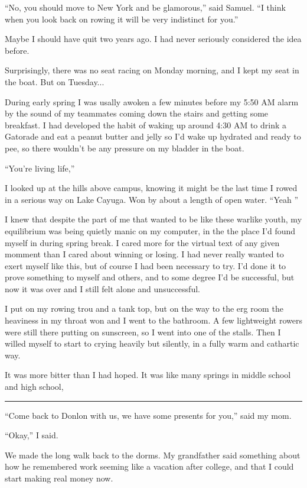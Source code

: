 ``No, you should move to New York and be glamorous,'' said Samuel.  ``I think
when you look back on rowing it will be very indistinct for you.'' 

Maybe I should have quit two years ago.  I had never seriously considered the
idea before.

Surprisingly, there was no seat racing on Monday morning, and I kept my seat in
the boat.  But on Tuesday...

During early spring I was usally awoken a few minutes before my 5:50 AM alarm by
the sound of my teammates coming down the stairs and getting some breakfast.  I
had developed the habit of waking up around 4:30 AM to drink a Gatorade and eat
a peanut butter and jelly so I'd wake up hydrated and ready to pee, so there
wouldn't be any pressure on my bladder in the boat. 

``You're living life,''

I looked up at the hills above campus, knowing it might be the last time I rowed
in a serious way on Lake Cayuga.  Won by about a length of open water.  ``Yeah
'' 

I knew that despite the part of me that wanted to be like these warlike youth,
my equilibrium was being quietly manic on my computer, in the the place I'd
found myself in during spring break.  I cared more for the virtual text of any
given momment than I cared about winning or losing.  I had never really wanted
to exert myself like this, but of course I had been necessary to try.  I'd done
it to prove something to myself and others, and to some degree I'd be
successful, but now it was over and I still felt alone and unsuccessful.

I put on my rowing trou and a tank top, but on the way to the erg room the
heaviness in my throat won and I went to the bathroom.  A few lightweight
rowers were still there putting on sunscreen, so I went into one of the stalls.
Then I willed myself to start to crying heavily but silently, in a fully warm
and cathartic way.  

It was more bitter than I had hoped.  It was like many springs in middle school
and high school, 

\plainfancybreak{12pt}{2}{* * *}

``Come back to Donlon with us, we have some presents for you,'' said my mom. 

``Okay,'' I said.  

We made the long walk back to the dorms.  My grandfather said something about
how he remembered work seeming like a vacation after college, and that I could
start making real money now.

